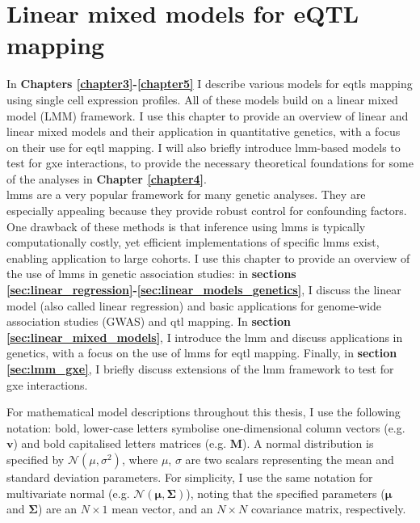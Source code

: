 
\chapter{Linear mixed models for eQTL mapping}
\label{chapter2}

In \textbf{Chapters 
\ref{chapter3}-\ref{chapter5}}
I describe 
various models for \glspl{eqtl} mapping using single cell expression profiles. 
All of these models build on a 
linear mixed model (LMM)
framework. 
I use this chapter to provide an overview of linear and linear mixed models and their application in quantitative genetics, with a focus on their use for \gls{eqtl} mapping. 
I will also briefly introduce \gls{lmm}-based models to test for \gls{gxe} interactions, to provide the necessary theoretical foundations for some of the analyses in \textbf{Chapter 
\ref{chapter4}}.
\\

\gls{lmm}s are a very popular framework for many genetic analyses. 
They are especially appealing because they provide robust control for confounding factors. 
One drawback of these methods is that inference using \gls{lmm}s is typically computationally costly, yet efficient implementations of specific \gls{lmm}s exist, enabling application to large cohorts. 
I use this chapter to provide an overview of the use of \gls{lmm}s in genetic association studies: in \textbf{sections \ref{sec:linear_regression}-\ref{sec:linear_models_genetics}}, I discuss the linear model (also called linear regression) and basic applications for genome-wide association studies (GWAS) and \gls{qtl} mapping. 
In \textbf{section \ref{sec:linear_mixed_models}}, I introduce the \gls{lmm} and discuss applications in genetics, with a focus on the use of \gls{lmm}s for \gls{eqtl} mapping. 
Finally, in \textbf{section \ref{sec:lmm_gxe}}, I briefly discuss extensions of the \gls{lmm} framework to test for \gls{gxe} interactions.\\

\newpage

For mathematical model descriptions throughout this thesis, I use the following notation: bold, lower-case letters symbolise one-dimensional column vectors (e.g. $\mathbf{v}$) and bold capitalised letters matrices (e.g. $\mathbf{M}$). 
A normal distribution is specified by $ \mathcal{N}(\mu, \sigma^2)$, where $\mu$, $\sigma$ are two scalars representing the mean and standard deviation parameters.
For simplicity, I use the same notation for multivariate normal (e.g. $ \mathcal{N}(\boldsymbol{\mu}, \boldsymbol{\Sigma})$), noting that the specified parameters ($\boldsymbol{\mu}$ and $\boldsymbol{\Sigma}$) are an $N \times 1$ mean vector, and an $N \times N$ covariance matrix, respectively.

